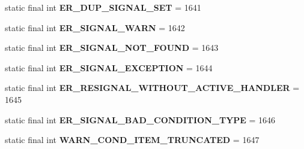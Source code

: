 \begin{DoxyCompactItemize}
static final int {\bfseries E\+R\+\_\+\+D\+U\+P\+\_\+\+S\+I\+G\+N\+A\+L\+\_\+\+S\+ET} = 1641
\item 
\mbox{\label{classcom_1_1mysql_1_1cj_1_1exceptions_1_1_mysql_error_numbers_aa082e85a44f48fc38bc696d0bb6dc764}} 
static final int {\bfseries E\+R\+\_\+\+S\+I\+G\+N\+A\+L\+\_\+\+W\+A\+RN} = 1642
\item 
\mbox{\label{classcom_1_1mysql_1_1cj_1_1exceptions_1_1_mysql_error_numbers_a523f06943ba129d947f1e4734f63dd92}} 
static final int {\bfseries E\+R\+\_\+\+S\+I\+G\+N\+A\+L\+\_\+\+N\+O\+T\+\_\+\+F\+O\+U\+ND} = 1643
\item 
\mbox{\label{classcom_1_1mysql_1_1cj_1_1exceptions_1_1_mysql_error_numbers_a55ea5cd73488970ff4e7fa66c9c3103c}} 
static final int {\bfseries E\+R\+\_\+\+S\+I\+G\+N\+A\+L\+\_\+\+E\+X\+C\+E\+P\+T\+I\+ON} = 1644
\item 
\mbox{\label{classcom_1_1mysql_1_1cj_1_1exceptions_1_1_mysql_error_numbers_af6e6ee806bc72c63ff2b765fcb28708b}} 
static final int {\bfseries E\+R\+\_\+\+R\+E\+S\+I\+G\+N\+A\+L\+\_\+\+W\+I\+T\+H\+O\+U\+T\+\_\+\+A\+C\+T\+I\+V\+E\+\_\+\+H\+A\+N\+D\+L\+ER} = 1645
\item 
\mbox{\label{classcom_1_1mysql_1_1cj_1_1exceptions_1_1_mysql_error_numbers_aa322cc0971a08eba6d27d8722430e198}} 
static final int {\bfseries E\+R\+\_\+\+S\+I\+G\+N\+A\+L\+\_\+\+B\+A\+D\+\_\+\+C\+O\+N\+D\+I\+T\+I\+O\+N\+\_\+\+T\+Y\+PE} = 1646
\item 
\mbox{\label{classcom_1_1mysql_1_1cj_1_1exceptions_1_1_mysql_error_numbers_a8dc3f5446f89cfd6b2987c44203e337b}} 
static final int {\bfseries W\+A\+R\+N\+\_\+\+C\+O\+N\+D\+\_\+\+I\+T\+E\+M\+\_\+\+T\+R\+U\+N\+C\+A\+T\+ED} = 1647
\item 
\mbox{\label{classcom_1_1mysql_1_1cj_1_1exceptions_1_1_mysql_error_numbers_a14c9d4c6476baf960b24acd23b086385}} 

\end{DoxyCompactItemize}
